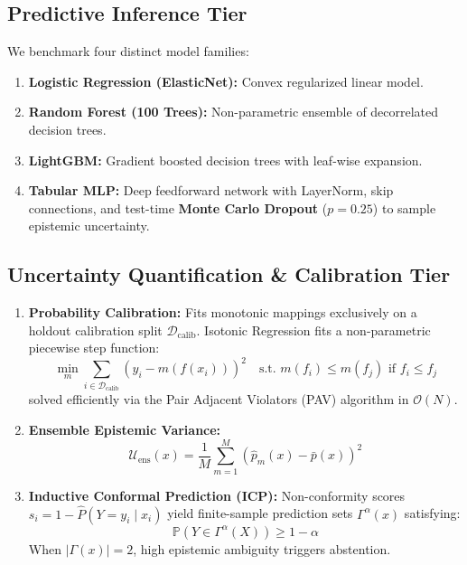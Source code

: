 \documentclass[10pt,a4paper,twocolumn]{article}
\begin{document}
\subsection{Predictive Inference Tier}
We benchmark four distinct model families:
\begin{enumerate}
  \item \textbf{Logistic Regression (ElasticNet):} Convex regularized linear model.
  \item \textbf{Random Forest (100 Trees):} Non-parametric ensemble of decorrelated decision trees.
  \item \textbf{LightGBM:} Gradient boosted decision trees with leaf-wise expansion.
  \item \textbf{Tabular MLP:} Deep feedforward network with LayerNorm, skip connections, and test-time \textbf{Monte Carlo Dropout} ($p=0.25$) to sample epistemic uncertainty.
\end{enumerate}

\subsection{Uncertainty Quantification \& Calibration Tier}
\begin{enumerate}
  \item \textbf{Probability Calibration:} Fits monotonic mappings exclusively on a holdout calibration split $\mathcal{D}_{\text{calib}}$. Isotonic Regression fits a non-parametric piecewise step function:
  \begin{equation}
    \min_m \sum_{i \in \mathcal{D}_{\text{calib}}} (y_i - m(f(x_i)))^2 \quad \text{s.t. } m(f_i) \le m(f_j) \text{ if } f_i \le f_j
  \end{equation}
  solved efficiently via the Pair Adjacent Violators (PAV) algorithm in $\mathcal{O}(N)$.
  \item \textbf{Ensemble Epistemic Variance:}
  \begin{equation}
    \mathcal{U}_{\text{ens}}(x) = \frac{1}{M} \sum_{m=1}^M (\hat{p}_m(x) - \bar{p}(x))^2
  \end{equation}
  \item \textbf{Inductive Conformal Prediction (ICP):} Non-conformity scores $s_i = 1 - \hat{P}(Y=y_i \mid x_i)$ yield finite-sample prediction sets $\Gamma^\alpha(x)$ satisfying:
  \begin{equation}
    \mathbb{P}(Y \in \Gamma^\alpha(X)) \ge 1 - \alpha
  \end{equation}
  When $|\Gamma(x)| = 2$, high epistemic ambiguity triggers abstention.
\end{enumerate}
\end{document}
